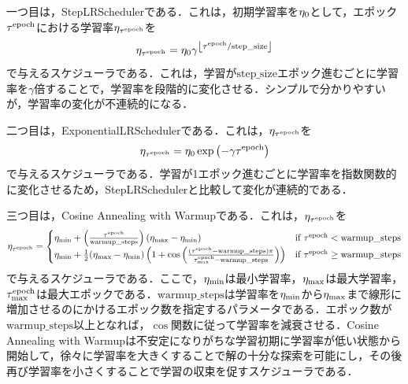 \documentclass[12pt]{jarticle}
\numberwithin{equation}{section}    %
\numberwithin{figure}{section}      %
\numberwithin{table}{section}      %
\begin{document}
一つ目は，StepLRSchedulerである．これは，初期学習率を$\eta_{0}$として，エポック$\tau^{\text{epoch}}$における学習率$\eta_{\tau^{\text{epoch}}}$を
\begin{equation}
    \eta_{\tau^{\text{epoch}}} = \eta_{0} \gamma^{\left\lfloor \tau^{\text{epoch}} / \text{step\_size} \right\rfloor}
\end{equation}
で与えるスケジューラである．これは，学習が$\text{step\_size}$エポック進むごとに学習率を$\gamma$倍することで，学習率を段階的に変化させる．シンプルで分かりやすいが，学習率の変化が不連続的になる．

二つ目は，ExponentialLRSchedulerである．これは，$\eta_{\tau^{\text{epoch}}}$を
\begin{equation}
    \eta_{\tau^{\text{epoch}}} = \eta_{0} \exp \left( -\gamma \tau^{\text{epoch}} \right)
\end{equation}
で与えるスケジューラである．学習が1エポック進むごとに学習率を指数関数的に変化させるため，StepLRSchedulerと比較して変化が連続的である．

三つ目は，Cosine Annealing with Warmupである．これは，$\eta_{\tau^{\text{epoch}}}$を
\begin{equation}
    \eta_{\tau^{\text{epoch}}} =
    \begin{cases}
        \eta_{\text{min}} + \left( \frac{\tau^{\text{epoch}}}{\text{warmup\_steps}} \right) (\eta_{\text{max}} - \eta_{\text{min}})                                                                                                        & \text{if $\tau^{\text{epoch}} < \text{warmup\_steps}$}   \\
        \eta_{\text{min}} + \frac{1}{2} (\eta_{\text{max}} - \eta_{\text{min}}) \left( 1 + \cos \left( \frac{(\tau^{\text{epoch}} - \text{warmup\_steps})\pi}{\tau^{\text{epoch}}_{\text{max}} - \text{warmup\_steps}} \right) \right) & \text{if $\tau^{\text{epoch}} \ge \text{warmup\_steps}$}
    \end{cases}
\end{equation}
で与えるスケジューラである．ここで，$\eta_{\text{min}}$は最小学習率，$\eta_{\text{max}}$は最大学習率，$\tau^{\text{epoch}}_{\text{max}}$は最大エポックである．$\text{warmup\_steps}$は学習率を$\eta_{\text{min}}$から$\eta_{\text{max}}$まで線形に増加させるのにかけるエポック数を指定するパラメータである．エポック数が$\text{warmup\_steps}$以上となれば，$\cos$関数に従って学習率を減衰させる．Cosine Annealing with Warmupは不安定になりがちな学習初期に学習率が低い状態から開始して，徐々に学習率を大きくすることで解の十分な探索を可能にし，その後再び学習率を小さくすることで学習の収束を促すスケジューラである．
\end{document}
